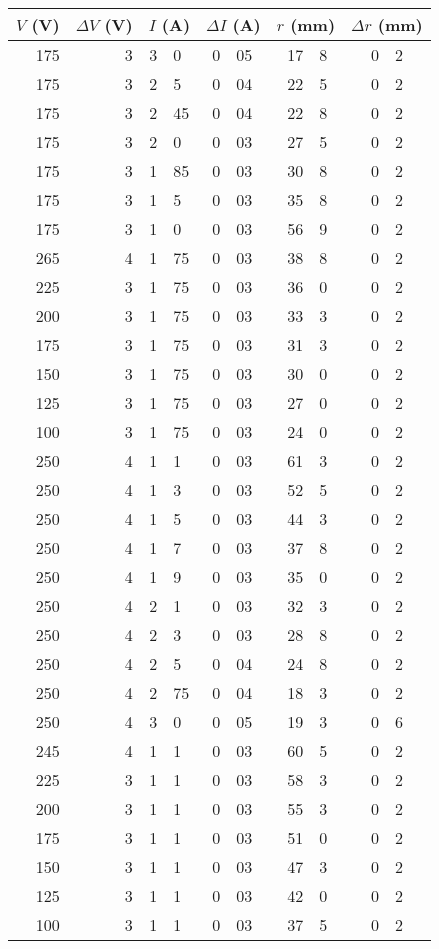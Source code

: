 \begin{table}
\begin{center}
\begin{tabular}{r|r|r@{.}l|r@{.}l|r@{.}l|r@{.}l}
\multicolumn{1}{c|}{$V$ (V)}&
\multicolumn{1}{c|}{$\Delta V$ (V)}&
\multicolumn{2}{c|}{$I$ (A)}&
\multicolumn{2}{c|}{$\Delta I$ (A)}&
\multicolumn{2}{c|}{$r$ (mm)}&
\multicolumn{2}{c|}{$\Delta r$ (mm)}\\\hline
175&	3&	3&0&	0&05&	17&8&	0&2\\
175&	3&	2&5&	0&04&	22&5&	0&2\\
175&	3&	2&45&	0&04&	22&8&	0&2\\
175&	3&	2&0&	0&03&	27&5&	0&2\\
175&	3&	1&85&	0&03&	30&8&	0&2\\
175&	3&	1&5&	0&03&	35&8&	0&2\\
175&	3&	1&0&	0&03&	56&9&	0&2\\\hline
265&	4&	1&75&	0&03&	38&8&	0&2\\
225&	3&	1&75&	0&03&	36&0&	0&2\\
200&	3&	1&75&	0&03&	33&3&	0&2\\
175&	3&	1&75&	0&03&	31&3&	0&2\\
150&	3&	1&75&	0&03&	30&0&	0&2\\
125&	3&	1&75&	0&03&	27&0&	0&2\\
100&	3&	1&75&	0&03&	24&0&	0&2\\\hline
250&	4&	1&1&	0&03&	61&3&	0&2\\
250&	4&	1&3&	0&03&	52&5&	0&2\\
250&	4&	1&5&	0&03&	44&3&	0&2\\
250&	4&	1&7&	0&03&	37&8&	0&2\\
250&	4&	1&9&	0&03&	35&0&	0&2\\
250&	4&	2&1&	0&03&	32&3&	0&2\\
250&	4&	2&3&	0&03&	28&8&	0&2\\
250&	4&	2&5&	0&04&	24&8&	0&2\\
250&	4&	2&75&	0&04&	18&3&	0&2\\
250&	4&	3&0&	0&05&	19&3&	0&6\\\hline
245&	4&	1&1&	0&03&	60&5&	0&2\\
225&	3&	1&1&	0&03&	58&3&	0&2\\
200&	3&	1&1&	0&03&	55&3&	0&2\\
175&	3&	1&1&	0&03&	51&0&	0&2\\
150&	3&	1&1&	0&03&	47&3&	0&2\\
125&	3&	1&1&	0&03&	42&0&	0&2\\
100&	3&	1&1&	0&03&	37&5&	0&2\\
\end{tabular}
\end{center}
\end{table}
